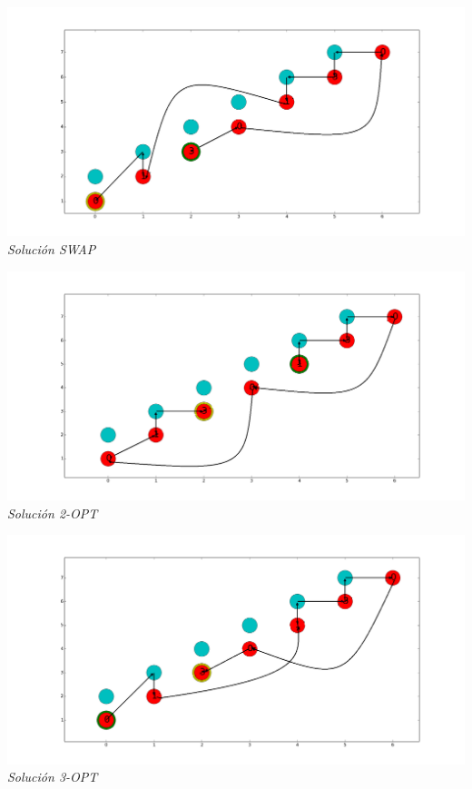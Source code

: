 \vspace*{0.3cm} \vspace*{0.3cm}
  \begin{center}
 \includegraphics[scale=0.3]{./EJ3/gym0swap.png}\\
 {            \textit{Soluci\'on SWAP}}
  \end{center}
  \vspace*{0.3cm}

\vspace*{0.3cm} \vspace*{0.3cm}
  \begin{center}
 \includegraphics[scale=0.3]{./EJ3/gym02opt.png}\\
 {            \textit{Soluci\'on 2-OPT}}
  \end{center}
  \vspace*{0.3cm}


\vspace*{0.3cm} \vspace*{0.3cm}
  \begin{center}
 \includegraphics[scale=0.3]{./EJ3/gym03opt.png}\\
 {            \textit{Soluci\'on 3-OPT}}
  \end{center}
  \vspace*{0.3cm}
  
